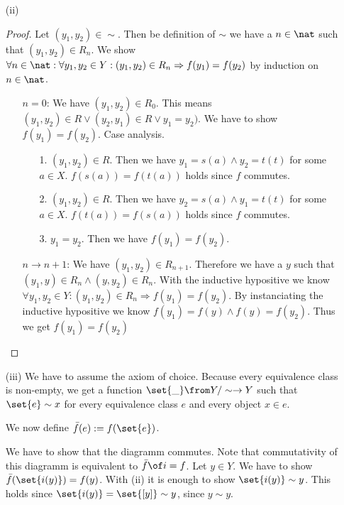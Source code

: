 \begin{answer}
\begin{itemize}
\begin{itemize}
        \item[(ii)]
          \begin{proof}
            Let $(y_1, y_2) \in \sim$. Then be definition of $\sim$ we have a $n\in\nat$ such that $(y_1, y_2) \in R_n$.
            We show $\forall n\in\nat: \forall y_1,y_2 \in Y: (y_1, y_2) \in R_n \Rightarrow f (y_1) = f (y_2)$ by induction on $n\in\nat$.
            \begin{itemize}
              \item[$n=0$:]
                We have $(y_1, y_2) \in R_0$. This means $(y_1, y_2) \in R \lor (y_2, y_1) \in R \lor y_1 = y_2)$.
                We have to show $f(y_1) = f(y_2)$. Case analysis.
                \begin{itemize}
                  \item[1.] $(y_1,y_2) \in R$. Then we have $y_1 = s(a) \land y_2 = t(t)$ for some $a \in X$. $f (s (a)) = f (t (a))$ holds since $f$ commutes.
                  \item[2.] $(y_1,y_2) \in R$. Then we have $y_2 = s(a) \land y_1 = t(t)$ for some $a \in X$. $f (t (a)) = f (s (a))$ holds since $f$ commutes.
                  \item[3.] $y_1=y_2$. Then we have $f(y_1) = f(y_2)$.
                \end{itemize}
              \item[$n \rightarrow n+1$:]
                We have $(y_1, y_2) \in R_{n+1}$. Therefore we have a $y$ such that $(y_1, y) \in R_n \land (y, y_2) \in R_n$.
                With the inductive hypositive we know $\forall y_1, y_2 \in Y: (y_1, y_2) \in R_n \Rightarrow f (y_1) = f (y_2)$.
                By instanciating the inductive hypositive we know $f (y_1) = f (y) \land f (y) = f (y_2)$.
                Thus we get $f (y_1) = f (y_2)$ \qedhere
            \end{itemize}
          \end{proof} %

        \item[(iii)]
          \newcommand{\choice}[1]{\set{#1}}
          We have to assume the axiom of choice. Because every equivalence class is non-empty, we get a function
          $\choice{ \_ } \from Y/\sim \to Y$ such that $\choice{ e } \sim x$ for every equivalence class $e$ and every object $x \in e$.

          We now define $\bar{f}(e) := f (\choice e)$.

          We have to show that the diagramm commutes. Note that commutativity of this diagramm is equivalent to $\bar{f} \of i =f$.
          Let $y \in Y$. We have to show $\bar{f}(\choice{i (y)}) = f(y)$. With (ii) it is enough to show $\choice{i (y)} \sim y$.
          This holds since $\choice{i (y)} = \choice{[y]} \sim y$, since $y \sim y$. \qedhere


\end{itemize}
\end{itemize}
\end{answer}
